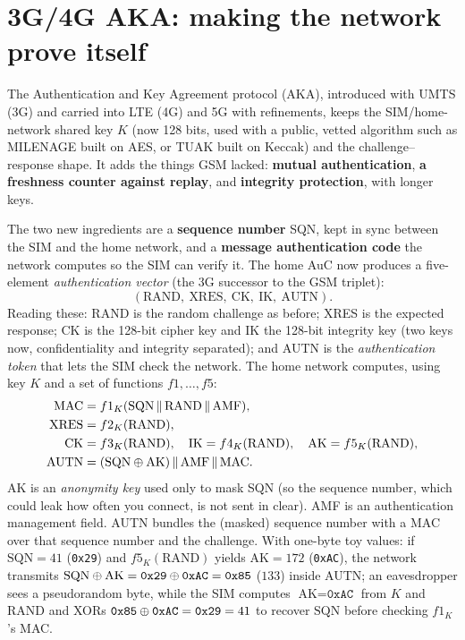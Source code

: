 \section{3G/4G AKA: making the network prove itself}
\label{ch29:aka}

The Authentication and Key Agreement protocol (AKA), introduced with UMTS (3G) and carried into LTE (4G) and 5G with refinements, keeps the SIM/home-network shared key $K$ (now 128 bits, used with a public, vetted algorithm such as MILENAGE built on AES, or TUAK built on Keccak) and the challenge--response shape. It adds the things GSM lacked: \textbf{mutual authentication}, \textbf{a freshness counter against replay}, and \textbf{integrity protection}, with longer keys.

The two new ingredients are a \textbf{sequence number} SQN, kept in sync between the SIM and the home network, and a \textbf{message authentication code} the network computes so the SIM can verify it. The home AuC now produces a five-element \emph{authentication vector} (the 3G successor to the GSM triplet):
\[
  (\text{RAND},\ \text{XRES},\ \text{CK},\ \text{IK},\ \text{AUTN}).
\]
Reading these: RAND is the random challenge as before; XRES is the expected response; CK is the 128-bit cipher key and IK the 128-bit integrity key (two keys now, confidentiality and integrity separated); and AUTN is the \emph{authentication token} that lets the SIM check the network. The home network computes, using key $K$ and a set of functions $f1,\dots,f5$:
\begin{align*}
  \text{MAC} &= f1_K(\text{SQN}\,\|\,\text{RAND}\,\|\,\text{AMF}), \\
  \text{XRES} &= f2_K(\text{RAND}), \\
  \text{CK} &= f3_K(\text{RAND}), \quad \text{IK} = f4_K(\text{RAND}), \quad \text{AK} = f5_K(\text{RAND}), \\
  \text{AUTN} &= (\text{SQN}\oplus\text{AK})\,\|\,\text{AMF}\,\|\,\text{MAC}.
\end{align*}
AK is an \emph{anonymity key} used only to mask SQN (so the sequence number, which could leak how often you connect, is not sent in clear). AMF is an authentication management field. AUTN bundles the (masked) sequence number with a MAC over that sequence number and the challenge. With one-byte toy values: if $\text{SQN} = 41$ (\texttt{0x29}) and $f5_K(\text{RAND})$ yields $\text{AK} = 172$ (\texttt{0xAC}), the network transmits $\text{SQN}\oplus\text{AK} = \texttt{0x29}\oplus\texttt{0xAC} = \texttt{0x85}$ ($133$) inside AUTN; an eavesdropper sees a pseudorandom byte, while the SIM computes $\text{AK}=\texttt{0xAC}$ from $K$ and $\text{RAND}$ and XORs $\texttt{0x85}\oplus\texttt{0xAC} = \texttt{0x29} = 41$ to recover $\text{SQN}$ before checking $f1_K$'s MAC.

